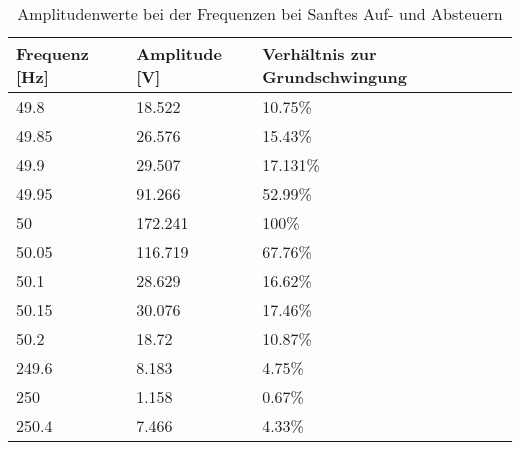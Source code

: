 \begin{table}[ht!]
	\centering
	\begin{tabular}{|l|l|l|}
		\hline
		Frequenz {[}Hz{]} & Amplitude {[}V{]} & Verhältnis zur Grundschwingung \\ \hline
		49.8              & 18.522            & 10.75\%                        \\ \hline
		49.85             & 26.576            & 15.43\%                        \\ \hline
		49.9              & 29.507            & 17.131\%                       \\ \hline
		49.95             & 91.266            & 52.99\%                        \\ \hline
		50                & 172.241           & 100\%                          \\ \hline
		50.05             & 116.719           & 67.76\%                        \\ \hline
		50.1              & 28.629            & 16.62\%                        \\ \hline
		50.15             & 30.076            & 17.46\%                        \\ \hline
		50.2              & 18.72             & 10.87\%                        \\ \hline
		249.6             & 8.183             & 4.75\%                         \\ \hline
		250               & 1.158             & 0.67\%                         \\ \hline
		250.4             & 7.466             & 4.33\%                         \\ \hline
	\end{tabular}
\caption{Amplitudenwerte bei der Frequenzen bei Sanftes Auf- und Absteuern}\label{tab:Mess_Spannung_AufAb_sanft}
\end{table}

